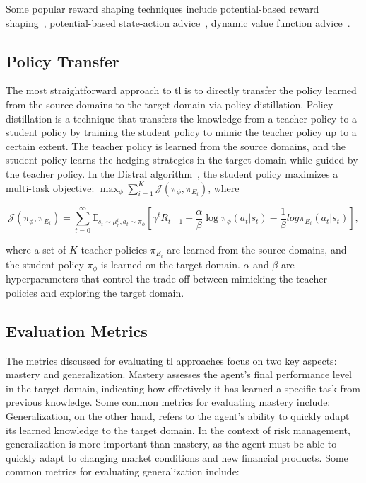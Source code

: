 Some popular reward shaping techniques include potential-based reward shaping~\citep{ng1999policy}, potential-based state-action advice~\citep{wiewiora2003principled}, dynamic value function advice~\citep{harutyunyan2015expressing}.

\subsection{Policy Transfer}

The most straightforward approach to \gls{tl} is to directly transfer the policy learned from the source domains to the target domain via policy distillation.
Policy distillation is a technique that transfers the knowledge from a teacher policy to a student policy by training the student policy to mimic the teacher policy up to a certain extent.
The teacher policy is learned from the source domains, and the student policy learns the hedging strategies in the target domain while guided by the teacher policy.
In the Distral algorithm~\citep{teh2017distral}, the student policy maximizes a multi-task objective:
$\max_{\phi} \sum_{i=1}^K \mathcal{J}(\pi_\phi, \pi_{E_i})$, where

\begin{equation}
    \mathcal{J}(\pi_\phi, \pi_{E_i}) = \sum_{t=0}^\infty \mathbb{E}_{s_t \sim \mu_0^t, a_t \sim \pi_\phi} \left[ \gamma^t R_{t+1} + \frac{\alpha}{\beta} \log \pi_{\phi}(a_t|s_t) - \frac{1}{\beta}log \pi_{E_i}(a_t|s_t) \right],
\end{equation}

where a set of $K$ teacher policies $\pi_{E_i}$ are learned from the source domains, and the student policy $\pi_\phi$ is learned on the target domain. $\alpha$ and $\beta$ are hyperparameters that control the trade-off between mimicking the teacher policies and exploring the target domain.

\subsection{Evaluation Metrics}

The metrics discussed for evaluating \gls{tl} approaches focus on two key aspects: mastery and generalization. 
Mastery assesses the agent's final performance level in the target domain, indicating how effectively it has learned a specific task from previous knowledge. 
Some common metrics for evaluating mastery include:
Generalization, on the other hand, refers to the agent's ability to quickly adapt its learned knowledge to the target domain.
In the context of risk management, generalization is more important than mastery, as the agent must be able to quickly adapt to changing market conditions and new financial products.
Some common metrics for evaluating generalization include:


